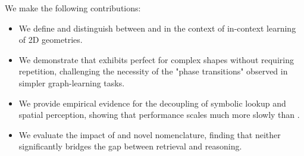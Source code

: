 We make the following contributions:
\begin{itemize}[leftmargin=*,itemsep=0pt,topsep=0pt]
    \item We define and distinguish between {\bf \addressing} and {\bf \reasoning} in the context of in-context learning of 2D geometries.
    \item We demonstrate that \gpt exhibits perfect \addressing for complex \svg shapes without requiring repetition, challenging the necessity of the "phase transitions" observed in simpler graph-learning tasks.
    \item We provide empirical evidence for the decoupling of symbolic lookup and spatial perception, showing that \reasoning performance scales much more slowly than \addressing.
    \item We evaluate the impact of \cotask and novel nomenclature, finding that neither significantly bridges the gap between retrieval and reasoning.
\end{itemize}
